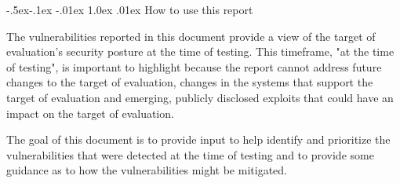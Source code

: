 \documentclass{article}
\makeatletter
\renewcommand{\subsection}{\@startsection{subsection}{2}{\z@}%
            {-.5ex\@plus -.1ex \@minus -.01ex}%
            {1.0ex \@plus .01ex}%
            {\normalfont\large\color{subsectioncolor}}}
\makeatother
\begin{document}
            \subsection{\large How to use this report}

            \large The vulnerabilities reported in this document provide a view of the target of evaluation's security posture
            at the time of testing. This timeframe, "at the time of testing", is important to highlight because the report
            cannot address future changes to the target of evaluation, changes in the systems that support the target of evaluation and emerging, publicly disclosed exploits that could have an impact on the target
            of evaluation.

            \large The goal of this document is to provide input to help identify and prioritize the vulnerabilities that were
            detected at the time of testing and to provide some guidance as to how the vulnerabilities might be
            mitigated.
            
\end{document}

